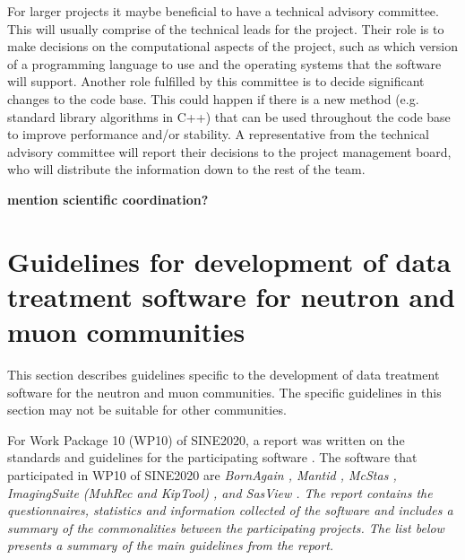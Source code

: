 \documentclass[jnr]{iosart2x}
\newcommand{\todo}[1]{\textbf{#1}}
\begin{document}
For larger projects it maybe beneficial to have a technical advisory committee.
This will usually comprise of the technical leads for the project.
Their role is to make decisions on the computational aspects of the project, such as which version of a programming language to use and the operating systems that the software will support.
Another role fulfilled by this committee is to decide significant changes to the code base.
This could happen if there is a new method (e.g. standard library algorithms in C++) that can be used throughout the code base to improve performance and/or stability.
A representative from the technical advisory committee will report their decisions to the project management board, who will distribute the information down to the rest of the team.

\todo{mention scientific coordination?}

\section{Guidelines for development of data treatment software for neutron and muon communities}
\label{SINE2020}

This section describes guidelines specific to the development of data treatment software for the neutron and muon communities.
The specific guidelines in this section may not be suitable for other communities.

For Work Package 10 (WP10) of SINE2020, a report was written on the standards and guidelines for the participating software \cite{sine2020_wp10_d10_report}.
The software that participated in WP10 of SINE2020 are \it BornAgain \cite{bornagain}, \it Mantid \cite{mantid}, \it McStas \cite{mcstats}, \it ImagingSuite (\it MuhRec and \it KipTool) \cite{ImagingSuite}, and \it SasView \cite{sasview}.
The report contains the questionnaires, statistics and information collected of the software and includes a summary of the commonalities between the participating projects.
The list below presents a summary of the main guidelines from the report.
\end{document}
